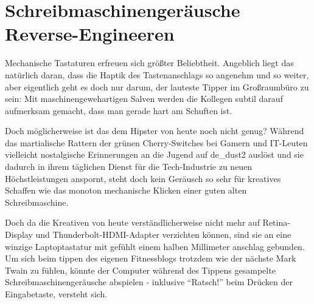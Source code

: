 \documentclass[a5paper,pagesize,10pt,bibtotoc,pointlessnumbers,normalheadings,DIV=9,twoside=false]{scrbook}
\begin{document}
\chapter{Schreibmaschinengeräusche Reverse-Engineeren}

Mechanische Tastaturen erfreuen sich größter Beliebtheit.
Angeblich liegt das natürlich daran, dass die Haptik des Tastenanschlags so angenehm und so weiter, aber eigentlich geht es doch nur darum, der lauteste Tipper im Großraumbüro zu sein:
Mit maschinengewehartigen Salven werden die Kollegen subtil darauf aufmerksam gemacht, dass man gerade hart am Schuften ist.

Doch möglicherweise ist das dem Hipster von heute noch nicht genug?
Während das martialische Rattern der grünen Cherry-Switches bei Gamern und IT-Leuten vielleicht nostalgische Erinnerungen an die Jugend auf de\_dust2 auslöst und sie dadurch in ihrem täglichen Dienst für die Tech-Industrie zu neuen Höchstleistungen anspornt, steht doch kein Geräusch so sehr für kreatives Schaffen wie das monoton mechanische Klicken einer guten alten Schreibmaschine.

Doch da die Kreativen von heute verständlicherweise nicht mehr auf Retina-Display und Thunderbolt-HDMI-Adapter verzichten können, sind sie an eine winzige Laptoptastatur mit gefühlt einem halben Millimeter anschlag gebunden.
Um sich beim tippen des eigenen Fitnessblogs trotzdem wie der nächste Mark Twain zu fühlen, könnte der Computer während des Tippens gesampelte Schreibmaschinengeräusche abspielen - inklusive ``Ratsch!'' beim Drücken der Eingabetaste, versteht sich.



\end{document}
